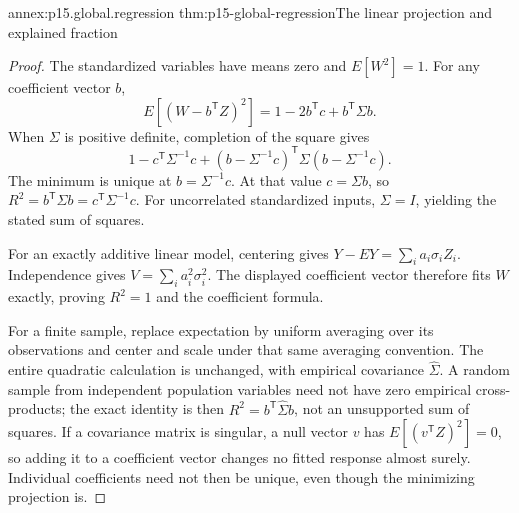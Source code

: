 \begin{annexitem}{annex:p15.global.regression}
 {thm:p15-global-regression}{The linear projection and explained fraction}
\begin{proof}
The standardized variables have means zero and \(E[W^2]=1\).
For any coefficient vector \(b\),
\[
 E[(W-b^\mathsf TZ)^2]=1-2b^\mathsf Tc+b^\mathsf T\Sigma b.
\]
When \(\Sigma\) is positive definite, completion of the square gives
\[
 1-c^\mathsf T\Sigma^{-1}c
  +(b-\Sigma^{-1}c)^\mathsf T
           \Sigma(b-\Sigma^{-1}c).
\]
The minimum is unique at \(b=\Sigma^{-1}c\).
At that value \(c=\Sigma b\), so
\(R^2=b^\mathsf T\Sigma b=c^\mathsf T\Sigma^{-1}c\).
For uncorrelated standardized inputs, \(\Sigma=I\), yielding
the stated sum of squares.

For an exactly additive linear model, centering gives
\(Y-EY=\sum_i a_i\sigma_iZ_i\).
Independence gives
\(V=\sum_i a_i^2\sigma_i^2\).
The displayed coefficient vector therefore fits \(W\) exactly, proving
\(R^2=1\) and the coefficient formula.

For a finite sample, replace expectation by uniform averaging over its
observations and center and scale under that same averaging convention.
The entire quadratic calculation is unchanged, with empirical covariance
\(\widehat\Sigma\). A random sample from independent population variables
need not have zero empirical cross-products; the exact identity is then
\(R^2=b^\mathsf T\widehat\Sigma b\), not an unsupported sum of squares.
If a covariance matrix is singular, a null vector \(v\) has
\(E[(v^\mathsf TZ)^2]=0\), so adding it to a coefficient vector changes
no fitted response almost surely. Individual coefficients need not then
be unique, even though the minimizing projection is.
\end{proof}
\end{annexitem}

